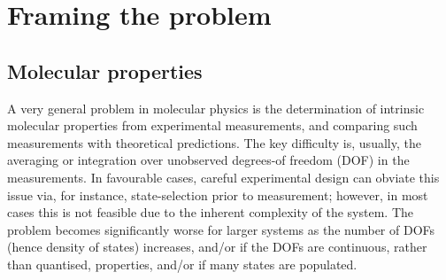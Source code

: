 \section{Framing the problem}

\subsection{Molecular properties}
A very general problem in molecular physics is the determination of intrinsic molecular properties from experimental measurements, and comparing such measurements with theoretical predictions. The key difficulty is, usually, the averaging or integration over unobserved degrees-of freedom (DOF) in the measurements. In favourable cases, careful experimental design can obviate this issue via, for instance, state-selection prior to measurement; however, in most cases this is not feasible due to the inherent complexity of the system. The problem becomes significantly worse for larger systems as the number of DOFs (hence density of states) increases, and/or if the DOFs are continuous, rather than quantised, properties, and/or if many states are populated.